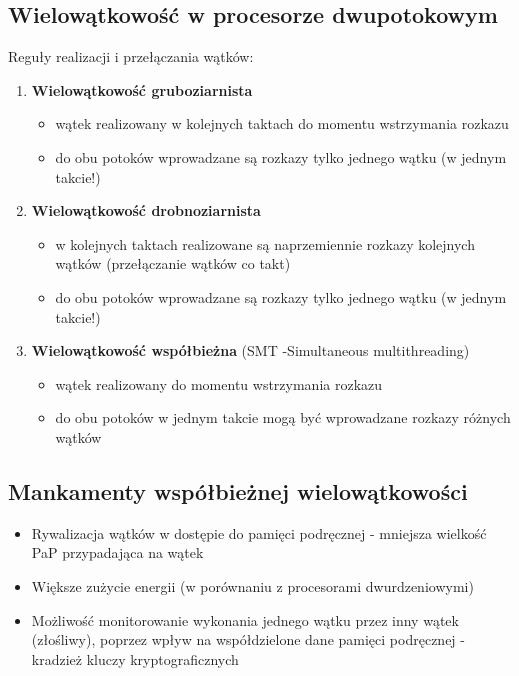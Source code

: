 	\subsection{Wielowątkowość w procesorze dwupotokowym}
		Reguły realizacji i przełączania wątków:
		\begin{enumerate}
			\item \textbf{Wielowątkowość gruboziarnista}
			\begin{itemize}
				\item wątek realizowany w kolejnych taktach do momentu wstrzymania rozkazu
				\item do obu potoków wprowadzane są rozkazy tylko jednego wątku (w jednym takcie!)
			\end{itemize}
			\item \textbf{Wielowątkowość drobnoziarnista}
			\begin{itemize}
				\item w kolejnych taktach realizowane są naprzemiennie rozkazy kolejnych wątków (przełączanie wątków co takt)
				\item do obu potoków wprowadzane są rozkazy tylko jednego wątku (w jednym takcie!)
			\end{itemize}
			\item \textbf{Wielowątkowość współbieżna} (SMT -Simultaneous multithreading)
			\begin{itemize}
				\item wątek realizowany do momentu wstrzymania rozkazu
				\item do obu potoków w jednym takcie mogą być wprowadzane rozkazy różnych wątków
			\end{itemize}
		\end{enumerate}
	\subsection{Mankamenty współbieżnej wielowątkowości}
		\begin{itemize}
			\item Rywalizacja wątków w dostępie do pamięci podręcznej - mniejsza wielkość PaP przypadająca na wątek
			\item Większe zużycie energii (w porównaniu z procesorami dwurdzeniowymi)
			\item Możliwość monitorowanie wykonania jednego wątku przez inny wątek (złośliwy), poprzez wpływ na współdzielone dane pamięci podręcznej - kradzież kluczy kryptograficznych
		\end{itemize}

